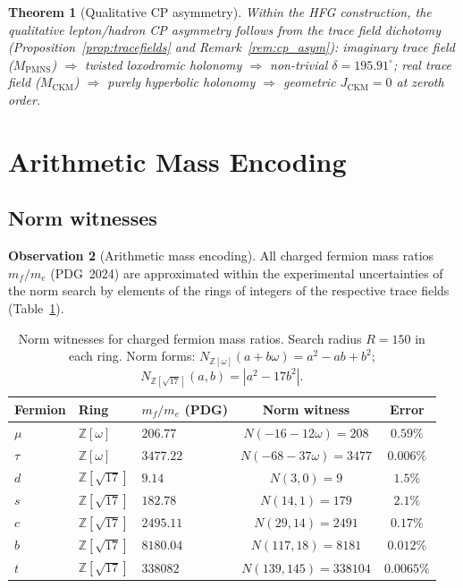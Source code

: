 \documentclass[11pt,a4paper]{article}
\newtheorem{theorem}{Theorem}
\theoremstyle{definition}
\newtheorem{observation}[theorem]{Observation}
\theoremstyle{remark}
\newcommand{\MPMNS}{M_{\mathrm{PMNS}}}
\newcommand{\MCKM}{M_{\mathrm{CKM}}}
\newcommand{\Zom}{\mathbb{Z}[\omega]}
\newcommand{\Zsev}{\mathbb{Z}[\sqrt{17}]}
\begin{document}
\begin{theorem}[Qualitative CP asymmetry]
\label{thm:cp_asym}
Within the HFG construction, the qualitative lepton/hadron
CP asymmetry follows from the trace field dichotomy
(Proposition~\ref{prop:tracefields} and
Remark~\ref{rem:cp_asym}):
imaginary trace field ($\MPMNS$) $\Rightarrow$ twisted
loxodromic holonomy $\Rightarrow$ non-trivial
$\delta=195.91^\circ$;
real trace field ($\MCKM$) $\Rightarrow$ purely hyperbolic
holonomy $\Rightarrow$ geometric $J_\mathrm{CKM}=0$
at zeroth order.
\end{theorem}

\section{Arithmetic Mass Encoding}
\label{sec:mass}

\subsection{Norm witnesses}

\begin{observation}[Arithmetic mass encoding]
\label{obs:mass}
All charged fermion mass ratios $m_f/m_e$ (PDG~2024) are
approximated within the experimental uncertainties of the
norm search by elements of the rings of integers of the
respective trace fields (Table~\ref{tab:witnesses}).
\end{observation}

\begin{table}[htbp]
\centering
\caption{Norm witnesses for charged fermion mass ratios.
Search radius $R=150$ in each ring.
Norm forms: $N_{\Zom}(a+b\omega)=a^2-ab+b^2$;
$N_{\Zsev}(a,b)=|a^2-17b^2|$.}
\label{tab:witnesses}
\begin{tabular}{lllcc}
\toprule
Fermion & Ring & $m_f/m_e$ (PDG) & Norm witness & Error \\
\midrule
$\mu$  & $\Zom$ & $206.77$
  & $N(-16-12\omega)=208$      & $0.59\%$ \\
$\tau$ & $\Zom$ & $3477.22$
  & $N(-68-37\omega)=3477$     & $0.006\%$ \\
\midrule
$d$ & $\Zsev$ & $9.14$
  & $N(3,0)=9$                  & $1.5\%$ \\
$s$ & $\Zsev$ & $182.78$
  & $N(14,1)=179$               & $2.1\%$ \\
$c$ & $\Zsev$ & $2495.11$
  & $N(29,14)=2491$             & $0.17\%$ \\
$b$ & $\Zsev$ & $8180.04$
  & $N(117,18)=8181$              & $0.012\%$ \\
$t$ & $\Zsev$ & $338082$
  & $N(139,145)=338104$         & $0.0065\%$ \\
\bottomrule
\end{tabular}
\end{table}
\end{document}
